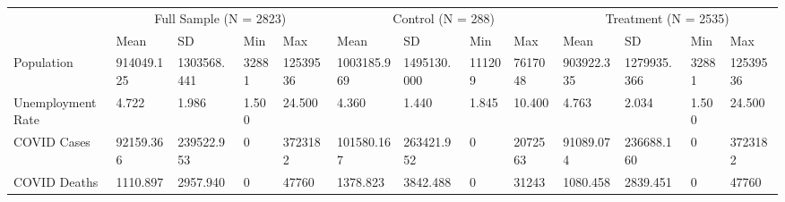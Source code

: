 \begin{tabular}{lllllllllllll}
\toprule
 & \multicolumn{4}{c}{Full Sample (N = 2823)} & \multicolumn{4}{c}{Control (N = 288)} & \multicolumn{4}{c}{Treatment (N = 2535)} \\
 & Mean & SD & Min & Max & Mean & SD & Min & Max & Mean & SD & Min & Max \\
\midrule
Population & 914049.125 & 1303568.441 & 32881 & 12539536 & 1003185.969 & 1495130.000 & 111209 & 7617048 & 903922.335 & 1279935.366 & 32881 & 12539536 \\
Unemployment Rate & 4.722 & 1.986 & 1.500 & 24.500 & 4.360 & 1.440 & 1.845 & 10.400 & 4.763 & 2.034 & 1.500 & 24.500 \\
COVID Cases & 92159.366 & 239522.953 & 0 & 3723182 & 101580.167 & 263421.952 & 0 & 2072563 & 91089.074 & 236688.160 & 0 & 3723182 \\
COVID Deaths & 1110.897 & 2957.940 & 0 & 47760 & 1378.823 & 3842.488 & 0 & 31243 & 1080.458 & 2839.451 & 0 & 47760 \\
\bottomrule
\end{tabular}
